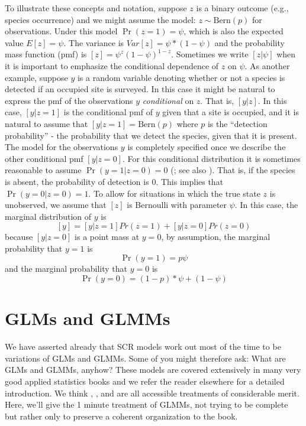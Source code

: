 To illustrate these concepts and notation, suppose $z$ is a binary
outcome (e.g., species occurrence) and we might assume the model: $z
\sim \mbox{Bern}(p)$ for observations.  Under this model $\Pr(z=1) =
\psi$, which is also the expected value $E[z] = \psi$. The variance is
$Var[z] = \psi*(1-\psi)$ and the probability mass function (pmf) is $[z]
= \psi^{z} (1-\psi)^{1-z}$. Sometimes we write $[z|\psi]$ when it is
important to emphasize the conditional dependence of $z$ on $\psi$. As
another example, suppose $y$ is a random variable denoting whether or
not a species is detected if an occupied site is surveyed. In this
case it might be natural to express the pmf of the observations $y$
{\it conditional} on $z$. That is, $[y|z]$. In this case, $[y|z=1]$ is
the conditional pmf of $y$ given that a site is occupied, and it is
natural to assume that $[y|z=1] = \mbox{Bern}(p)$ where $p$ is the
``detection probability'' - the probability that we detect the
species, given that it is present. The model for the observations $y$
is completely specified once we describe the other conditional pmf
$[y|z=0]$. For this conditional distribution it is sometimes
reasonable to assume $\Pr(y=1|z=0) = 0$ (\citet{mackenzie_etal:2002};
see also \citet{royle_link:2006}). That is, if the species is absent,
the probability of detection is 0. This implies that
$\Pr(y=0|z=0)=1$. To allow for situations in which the true state $z$
is unobserved, we  assume that $[z]$ is Bernoulli with parameter
$\psi$.  In this case, the marginal distribution of $y$ is
\[
 [y] = [y|z=1]Pr(z=1) + [y|z=0]Pr(z=0)
\]
because $[y|z=0]$ is a point mass at $y=0$, by assumption, the marginal
probability that $y=1$ is
\[
\Pr(y=1) = p \psi
\]
and the marginal probability that $y=0$ is
\[
\Pr(y=0) = (1-p)*\psi + (1-\psi)
\]


\section{
GLMs and GLMMs}
We have asserted already that SCR models work out most of the time to
be variations of GLMs and GLMMs. Some of you might therefore ask: What
are GLMs and GLMMs, anyhow?   These models are covered extensively in
many very good applied statistics books and we refer the reader
elsewhere for a detailed introduction. We think \citet{kery:2010},
\citet{kery_schaub:2011}, and \citet{zuur_etal:2009} are all
accessible treatments of considerable merit. Here, we'll give the 1
minute
treatment of GLMMs, not trying to be complete but rather only
to preserve a coherent organization to the book.


